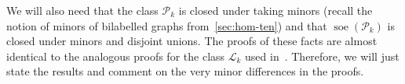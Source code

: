 \documentclass[a4paper,onecolumn,11pt,accepted=2026-01-06]{quantumarticle}
\theoremstyle{plain}
\newtheorem{lem}[thm]{Lemma}
\theoremstyle{remark}
\theoremstyle{definition}
\DeclareMathOperator{\soe}{soe}
\def\calP{{\mathcal P}} \def\calQ{{\mathcal Q}} \def\calR{{\mathcal R}}
\begin{document}
We will also need that the class $\calP_k$ is closed under taking minors (recall the notion of minors of bilabelled graphs from~\cref{sec:hom-ten}) and that $\soe(\calP_k)$ is closed under minors and disjoint unions. The proofs of these facts are almost identical to the analogous proofs for the class $\mathcal{L}_k$ used in~\cite{roberson-seppelt-arxiv}. Therefore, we will just state the results and comment on the very minor differences in the proofs.





\end{document}
